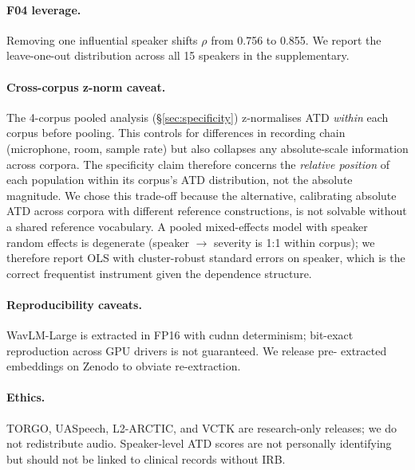 \paragraph{F04 leverage.}
Removing one influential speaker shifts $\rho$ from 0.756 to 0.855. We
report the leave-one-out distribution across all 15 speakers in the
supplementary.

\paragraph{Cross-corpus z-norm caveat.}
The 4-corpus pooled analysis (\S\ref{sec:specificity}) z-normalises
ATD \emph{within} each corpus before pooling. This controls for
differences in recording chain (microphone, room, sample rate) but
also collapses any absolute-scale information across corpora. The
specificity claim therefore concerns the \emph{relative position} of
each population within its corpus's ATD distribution, not the
absolute magnitude. We chose this trade-off because the alternative,
calibrating absolute ATD across corpora with different reference
constructions, is not solvable without a shared reference vocabulary.
A pooled mixed-effects model with speaker random effects is degenerate
(speaker $\to$ severity is 1:1 within corpus); we therefore report
OLS with cluster-robust standard errors on speaker, which is the
correct frequentist instrument given the dependence structure.

\paragraph{Reproducibility caveats.}
WavLM-Large is extracted in FP16 with cudnn determinism; bit-exact
reproduction across GPU drivers is not guaranteed. We release pre-
extracted embeddings on Zenodo to obviate re-extraction.

\paragraph{Ethics.}
TORGO, UASpeech, L2-ARCTIC, and VCTK are research-only releases; we do
not redistribute audio. Speaker-level ATD scores are not personally
identifying but should not be linked to clinical records without IRB.
